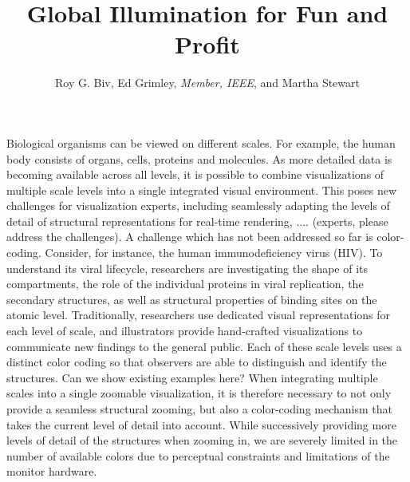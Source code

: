 \documentclass[journal]{vgtc}                %
\title{Global Illumination for Fun and Profit}
\author{Roy G. Biv, Ed Grimley, \textit{Member, IEEE}, and Martha Stewart}
\begin{document}


\maketitle


Biological organisms can be viewed on different scales. For example, the human body consists of organs, cells, proteins and molecules. As more detailed data is becoming available across all levels, it is possible to combine visualizations of multiple scale levels into a single integrated visual environment. This poses new challenges for visualization experts, including seamlessly adapting the levels of detail of structural representations for real-time rendering, .... (experts, please address the challenges). \newline
A challenge which has not been addressed so far is color-coding. Consider, for instance, the human immunodeficiency virus (HIV). To understand its viral lifecycle, researchers are investigating the shape of its compartments, the role of the individual proteins in viral replication, the secondary structures, as well as structural properties of binding sites on the atomic level. Traditionally, researchers use dedicated visual representations for each level of scale, and illustrators provide hand-crafted visualizations to communicate new findings to the general public. Each of these scale levels uses a distinct color coding so that observers are able to distinguish and identify the structures. Can we show existing examples here? \newline
When integrating multiple scales into a single zoomable visualization, it is therefore necessary to not only provide a seamless structural zooming, but also a color-coding mechanism that takes the current level of detail into account. While successively providing more levels of detail of the structures when zooming in, we are severely limited in the number of available colors due to perceptual constraints and limitations of the monitor hardware. \newline
\end{document}
